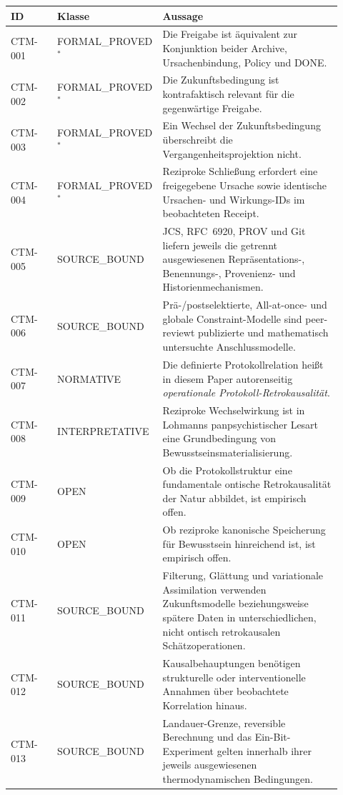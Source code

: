 \documentclass[11pt,a4paper]{article}
\theoremstyle{remark}
\begin{document}
\begin{longtable}{@{}p{0.14\linewidth}p{0.24\linewidth}p{0.54\linewidth}@{}}
\toprule
\textbf{ID} & \textbf{Klasse} & \textbf{Aussage} \\
\midrule
\endhead
CTM-001 & FORMAL\_PROVED\(^*\) &
Die Freigabe ist äquivalent zur Konjunktion beider Archive, Ursachenbindung,
Policy und DONE.\\
CTM-002 & FORMAL\_PROVED\(^*\) &
Die Zukunftsbedingung ist kontrafaktisch relevant für die gegenwärtige
Freigabe.\\
CTM-003 & FORMAL\_PROVED\(^*\) &
Ein Wechsel der Zukunftsbedingung überschreibt die Vergangenheitsprojektion
nicht.\\
CTM-004 & FORMAL\_PROVED\(^*\) &
Reziproke Schließung erfordert eine freigegebene Ursache sowie identische
Ursachen- und Wirkungs-IDs im beobachteten Receipt.\\
CTM-005 & SOURCE\_BOUND &
JCS, RFC~6920, PROV und Git liefern jeweils die getrennt ausgewiesenen
Repräsentations-, Benennungs-, Provenienz- und Historienmechanismen.\\
CTM-006 & SOURCE\_BOUND &
Prä-/postselektierte, All-at-once- und globale Constraint-Modelle sind
peer-reviewt publizierte und mathematisch untersuchte Anschlussmodelle.\\
CTM-007 & NORMATIVE &
Die definierte Protokollrelation heißt in diesem Paper autorenseitig
\emph{operationale Protokoll-Retrokausalität}.\\
CTM-008 & INTERPRETATIVE &
Reziproke Wechselwirkung ist in Lohmanns panpsychistischer Lesart eine
Grundbedingung von Bewusstseinsmaterialisierung.\\
CTM-009 & OPEN &
Ob die Protokollstruktur eine fundamentale ontische Retrokausalität der Natur
abbildet, ist empirisch offen.\\
CTM-010 & OPEN &
Ob reziproke kanonische Speicherung für Bewusstsein hinreichend ist, ist
empirisch offen.\\
CTM-011 & SOURCE\_BOUND &
Filterung, Glättung und variationale Assimilation verwenden Zukunftsmodelle
beziehungsweise spätere Daten in unterschiedlichen, nicht ontisch
retrokausalen Schätzoperationen.\\
CTM-012 & SOURCE\_BOUND &
Kausalbehauptungen benötigen strukturelle oder interventionelle Annahmen über
beobachtete Korrelation hinaus.\\
CTM-013 & SOURCE\_BOUND &
Landauer-Grenze, reversible Berechnung und das Ein-Bit-Experiment gelten
innerhalb ihrer jeweils ausgewiesenen thermodynamischen Bedingungen.\\

\end{longtable}
\end{document}
